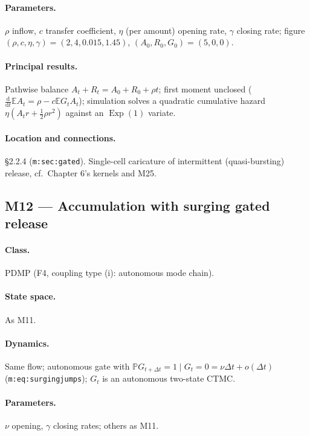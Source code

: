 \documentclass[11pt,a4paper]{article}
\newcommand{\PR}{\mathbb{P}}
\newcommand{\EX}{\mathbb{E}}
\newcommand{\dd}{\mathrm{d}}
\newcommand{\Exp}{\operatorname{Exp}}
\begin{document}
\paragraph{Parameters.} $\rho$ inflow, $c$ transfer coefficient, $\eta$
(per amount) opening rate, $\gamma$ closing rate; figure
$(\rho,c,\eta,\gamma)=(2,4,0.015,1.45)$, $(A_0,R_0,G_0)=(5,0,0)$.

\paragraph{Principal results.} Pathwise balance $A_t+R_t=A_0+R_0+\rho t$;
first moment unclosed ($\frac{\dd}{\dd t}\EX{A_t}=\rho-c\EX{G_tA_t}$);
simulation solves a quadratic cumulative hazard
$\eta(A_tr+\tfrac12\rho r^2)$ against an $\Exp(1)$ variate.

\paragraph{Location and connections.} \S2.2.4 (\texttt{m:sec:gated}).
Single-cell caricature of intermittent (quasi-bursting) release, cf.\
Chapter 6's kernels and M25.

\subsection{M12 --- Accumulation with surging gated release}

\paragraph{Class.} PDMP (F4, coupling type (i): autonomous mode chain).

\paragraph{State space.} As M11.

\paragraph{Dynamics.} Same flow; autonomous gate with
$\PR{G_{t+\Delta t}=1\mid G_t=0}=\nu\Delta t+o(\Delta t)$
(\texttt{m:eq:surgingjumps}); $G_t$ is an autonomous two-state CTMC.

\paragraph{Parameters.} $\nu$ opening, $\gamma$ closing rates; others as
M11.
\end{document}
